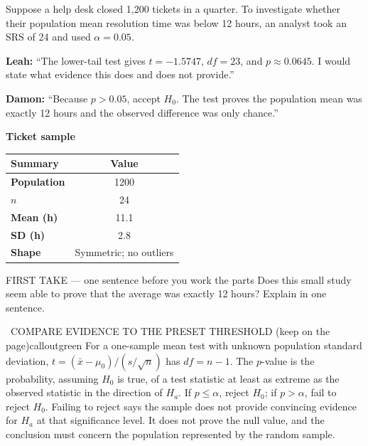 \documentclass[11pt]{article}
\begin{document}


Suppose a help desk closed 1,200 tickets in a quarter. To investigate whether their population mean resolution time was below 12 hours, an analyst took an SRS of 24 and used $\alpha=0.05$.\par\smallskip \textbf{Leah:} ``The lower-tail test gives $t=-1.5747$, $df=23$, and $p\approx0.0645$. I would state what evidence this does and does not provide.''\par \textbf{Damon:} ``Because $p>0.05$, accept $H_0$. The test proves the population mean was exactly 12 hours and the observed difference was only chance.''\par
\begin{center}
\textbf{Ticket sample}\par\smallskip
\begin{tabular}{|l|c|}
\hline
\textbf{Summary} & \textbf{Value} \\ \hline
\textbf{Population} & 1200 \\ \hline
\textbf{$n$} & 24 \\ \hline
\textbf{Mean (h)} & 11.1 \\ \hline
\textbf{SD (h)} & 2.8 \\ \hline
\textbf{Shape} & Symmetric; no outliers \\ \hline
\end{tabular}
\end{center}
\begin{firsttakebox}{FIRST TAKE --- one sentence before you work the parts}
Does this small study seem able to prove that the average was exactly 12 hours? Explain in one sentence.
\workspace{0.9in}
\end{firsttakebox}

\begin{callout}{\IconBook\ COMPARE EVIDENCE TO THE PRESET THRESHOLD (keep on the page)}{calloutgreen}
For a one-sample mean test with unknown population standard deviation,
$t=(\bar x-\mu_0)/(s/\sqrt n)$ has $df=n-1$. The $p$-value is the probability, assuming $H_0$ is true,
of a test statistic at least as extreme as the observed statistic in the direction of $H_a$.
If $p\leq\alpha$, reject $H_0$; if $p>\alpha$, fail to reject $H_0$. Failing to reject says the sample
does not provide convincing evidence for $H_a$ at that significance level. It does not prove the null value,
and the conclusion must concern the population represented by the random sample.
\end{callout}
\end{document}
